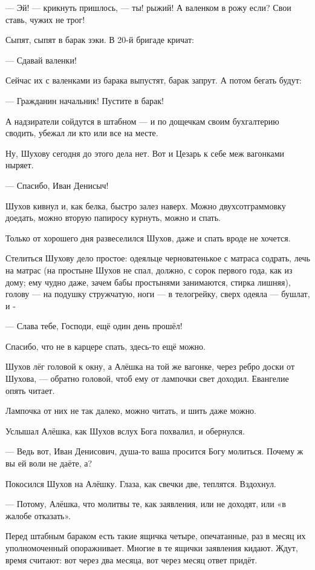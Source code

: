 --- Эй! --- крикнуть пришлось, --- ты! рыжий! А валенком в рожу если? Свои ставь, чужих не трог!

Сыпят, сыпят в барак зэки. В 20-й бригаде кричат:

--- Сдавай валенки!

Сейчас их с валенками из барака выпустят, барак запрут. А потом бегать будут:

--- Гражданин начальник! Пустите в барак!

А надзиратели сойдутся в штабном --- и по дощечкам своим бухгалтерию сводить, убежал ли кто
или все на месте.

Ну, Шухову сегодня до этого дела нет. Вот и Цезарь к себе меж вагонками ныряет.

--- Спасибо, Иван Денисыч!

Шухов кивнул и, как белка, быстро залез наверх. Можно двухсотграммовку доедать, можно вторую
папиросу курнуть, можно и спать.

Только от хорошего дня развеселился Шухов, даже и спать вроде не хочется.

Стелиться Шухову дело простое: одеяльце черноватенькое с матраса содрать, лечь на матрас (на
простыне Шухов не спал, должно, с сорок первого года, как из дому; ему чудно даже, зачем бабы
простынями занимаются, стирка лишняя), голову --- на подушку стружчатую, ноги --- в телогрейку,
сверх одеяла --- бушлат, и -

--- Слава тебе, Господи, ещё один день прошёл!

Спасибо, что не в карцере спать, здесь-то ещё можно.

Шухов лёг головой к окну, а Алёшка на той же вагонке, через ребро доски от Шухова, --- обратно
головой, чтоб ему от лампочки свет доходил. Евангелие опять читает.

Лампочка от них не так далеко, можно читать, и шить даже можно.

Услышал Алёшка, как Шухов вслух Бога похвалил, и обернулся.

--- Ведь вот, Иван Денисович, душа-то ваша просится Богу молиться. Почему ж вы ей воли не даёте,
а?

Покосился Шухов на Алёшку. Глаза, как свечки две, теплятся. Вздохнул.

--- Потому, Алёшка, что молитвы те, как заявления, или не доходят, или «в жалобе отказать».

Перед штабным бараком есть такие ящичка четыре, опечатанные, раз в месяц их уполномоченный
опоражнивает. Многие в те ящички заявления кидают. Ждут, время считают: вот через два месяца,
вот через месяц ответ придёт.

